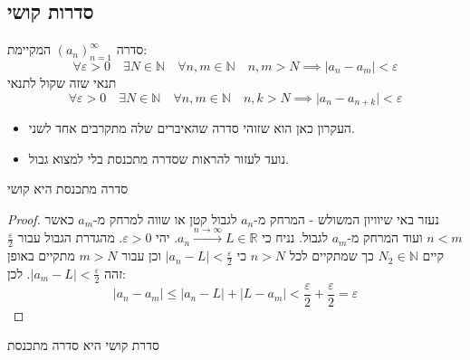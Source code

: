 \documentclass{tstextbook}
\begin{document}
\subsection{סדרות קושי}

\begin{definition}
סדרה \((a_n)_{n=1}^\infty\) המקיימת:
$$\forall \varepsilon > 0\quad \exists N \in \mathbb{N}\quad \forall n,m \in \mathbb{N}\quad n,m>N\implies \lvert a_{n}-a_{m} \rvert <\varepsilon$$
תנאי שזה שקול לתנאי 
$$\forall \varepsilon > 0\quad \exists N \in \mathbb{N}\quad \forall n,m \in \mathbb{N}\quad n,k>N\implies \lvert a_{n}-a_{n+k} \rvert <\varepsilon$$

  \begin{itemize}
    \item העקרון כאן הוא שזוהי סדרה שהאיברים שלה מתקרבים אחד לשני.
    \item נועד לעזור להראות שסדרה מתכנסת בלי למצוא גבול.
  \end{itemize}
\end{definition}
\begin{proposition}
סדרה מתכנסת היא קושי

\end{proposition}
\begin{proof}
נעזר באי שיוויון המשולש - המרחק מ-\(a_{n}\) לגבול קטן או שווה למרחק מ-\(a_{m}\) כאשר \(n<m\) ועוד המרחק מ-\(a_{m}\) לגבול.
נניח כי \(a_{n}\xrightarrow{n\to \infty}L \in \mathbb{R}\). יהי \(\varepsilon>0\). מהגדרת הגבול עבור \(\frac{\varepsilon}{2}\) קיים \(N_{2} \in \mathbb{N}\) כך שמתקיים לכל \(n>N\) כי \(\lvert a_{n}-L \rvert<\frac{\varepsilon}{2}\) וכן
עבור \(m>N\) מתקיים באופן זהה \(\lvert a_{m}-L \rvert<\frac{\varepsilon}{2}\). לכן:
$$\lvert a_{n}-a_{m} \rvert \leq \lvert a_{n}-L \rvert +\lvert L-a_{m} \rvert <\frac{\varepsilon}{2}+\frac{\varepsilon}{2}=\varepsilon$$

\end{proof}
\begin{proposition}
סדרת קושי היא סדרה מתכנסת

\end{proposition}
\end{document}
